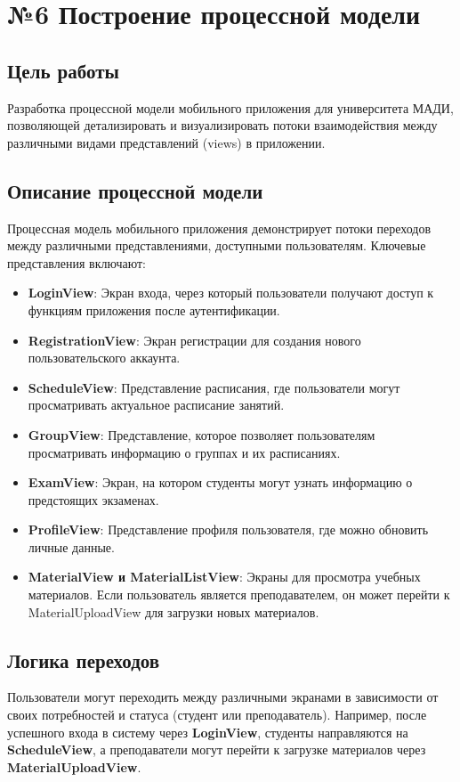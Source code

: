 \documentclass[a4paper,12pt]{article}
\begin{document}
\section{№6 Построение процессной модели}

\subsection{Цель работы}
Разработка процессной модели мобильного приложения для университета МАДИ, позволяющей детализировать и визуализировать потоки взаимодействия между различными видами представлений (views) в приложении.

\subsection{Описание процессной модели}
Процессная модель мобильного приложения демонстрирует потоки переходов между различными представлениями, доступными пользователям. Ключевые представления включают:

\begin{itemize}
    \item \textbf{LoginView}: Экран входа, через который пользователи получают доступ к функциям приложения после аутентификации.
    \item \textbf{RegistrationView}: Экран регистрации для создания нового пользовательского аккаунта.
    \item \textbf{ScheduleView}: Представление расписания, где пользователи могут просматривать актуальное расписание занятий.
    \item \textbf{GroupView}: Представление, которое позволяет пользователям просматривать информацию о группах и их расписаниях.
    \item \textbf{ExamView}: Экран, на котором студенты могут узнать информацию о предстоящих экзаменах.
    \item \textbf{ProfileView}: Представление профиля пользователя, где можно обновить личные данные.
    \item \textbf{MaterialView и MaterialListView}: Экраны для просмотра учебных материалов. Если пользователь является преподавателем, он может перейти к MaterialUploadView для загрузки новых материалов.
\end{itemize}

\subsection{Логика переходов}
Пользователи могут переходить между различными экранами в зависимости от своих потребностей и статуса (студент или преподаватель). Например, после успешного входа в систему через \textbf{LoginView}, студенты направляются на \textbf{ScheduleView}, а преподаватели могут перейти к загрузке материалов через \textbf{MaterialUploadView}.
\end{document}
